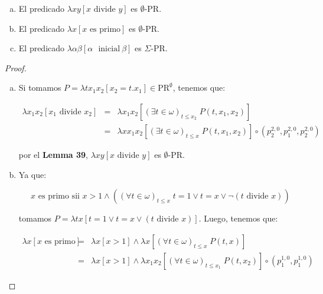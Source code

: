   \begin{lemma}
    \begin{enumerate}[a)]
      \item El predicado $\lambda xy\left[x \text{ divide } y\right]$ es $\emptyset$-PR.
      \item El predicado $\lambda x\left[x \text{ es primo}\right]$ es $\emptyset$-PR.
      \item El predicado $\lambda \alpha\beta \left[\alpha \text{\ }\mathrm{ inicial}\ \beta \right]$ es $\Sigma$-PR.
    \end{enumerate}
  \end{lemma}
  \begin{proof}
    \begin{enumerate}[a)]
      \item Si tomamos $P = \lambda tx_{1}x_{2}\left[x_{2}=t.x_{1}\right] \in \mathrm{PR}^{\emptyset}$, tenemos que:

        \begin{eqnarray}
          \nonumber \lambda x_{1}x_{2} \left[x_{1}\text{ divide } x_{2}\right] &=& \lambda x_{1}x_{2}\left[(\exists t
            \in \omega)_{t\leq x_{2}} \; P(t,x_{1},x_{2}) \right] \\
          \nonumber &=& \lambda xx_{1}x_{2}\left[(\exists t \in \omega)_{t\leq x} \; P(t,x_{1},x_{2})\right] \circ
            \left(p_{2}^{2,0}, p_{1}^{2,0}, p_{2}^{2,0}\right)
        \end{eqnarray}

        \par por el \textbf{Lemma 39}, $\lambda xy\left[x \text{ divide } y\right]$ es $\emptyset$-PR.

      \item Ya que:

        \[
          x \text{ es primo sii } x > 1 \wedge \left((\forall t \in \omega)_{t\leq x} \; t=1 \vee t=x \vee \lnot
          (t\text{ divide } x)\right)
        \]

        \par tomamos $P = \lambda tx \left[ t=1 \vee t=x \vee (t \text{ divide } x)\right]$. Luego, tenemos que:

        \begin{eqnarray}
          \nonumber \lambda x \left[x \text{ es primo}\right] &=& \lambda x \left[x > 1\right] \wedge \lambda x
            \left[(\forall t \in \omega)_{t \leq x} \; P(t,x) \right] \\
          \nonumber &=& \lambda x \left[x > 1\right] \wedge \lambda x_{1} x_{2} \left[(\forall t \in \omega)_{t \leq
            x_{1}} \; P(t,x_{2}) \right] \circ (p_{1}^{1,0}, p_{1}^{1,0})
        \end{eqnarray}


\end{enumerate}
\end{proof}
